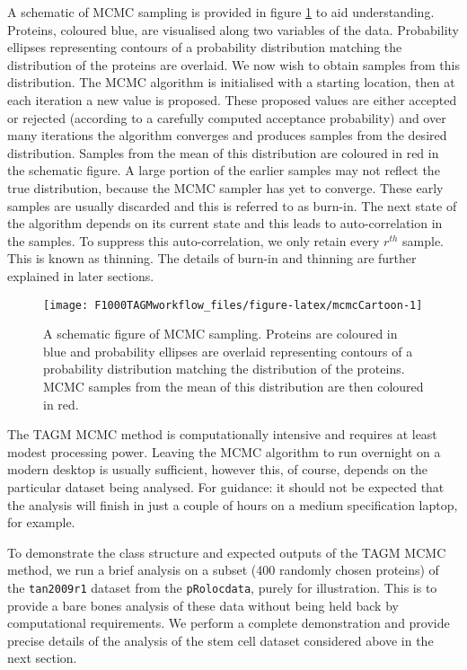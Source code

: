 \documentclass[9pt,a4paper,]{extarticle}
\begin{document}
A schematic of MCMC sampling is provided in figure
\ref{fig:mcmcCartoon} to aid understanding. Proteins, coloured blue,
are visualised along two variables of the data. Probability ellipses
representing contours of a probability distribution matching the
distribution of the proteins are overlaid. We now wish to obtain
samples from this distribution. The MCMC algorithm is initialised with
a starting location, then at each iteration a new value is
proposed. These proposed values are either accepted or rejected
(according to a carefully computed acceptance probability) and over
many iterations the algorithm converges and produces
samples from the desired distribution. Samples from the mean of this distribution
are coloured in red in the schematic figure. A large portion of the earlier
samples may not reflect the true distribution, because the MCMC
sampler has yet to converge. These early samples are usually discarded
and this is referred to as burn-in. The next state of the
algorithm depends on its current state and this leads to
auto-correlation in the samples. To suppress this auto-correlation, we
only retain every \(r^{th}\) sample. This is known as thinning. The details of burn-in and
thinning are further explained in later sections.

\begin{figure}

{\centering \texttt{[image: F1000TAGMworkflow\_files/figure-latex/mcmcCartoon-1]} 

}

\caption{A schematic figure of MCMC sampling. Proteins are coloured in blue and probability ellipses are overlaid representing contours of a probability distribution matching the distribution of the proteins. MCMC samples from the mean of this distribution are then coloured in red.}\label{fig:mcmcCartoon}
\end{figure}

The TAGM MCMC method is computationally intensive and requires at
least modest processing power. Leaving the MCMC algorithm to run
overnight on a modern desktop is usually sufficient, however this, of
course, depends on the particular dataset being analysed. For guidance: it should not be expected that the
analysis will finish in just a couple of hours on a medium specification
laptop, for example.

To demonstrate the class structure and expected outputs of the TAGM
MCMC method, we run a brief analysis on a subset (400 randomly
chosen proteins) of the \texttt{tan2009r1} dataset from the \texttt{pRolocdata},
purely for illustration. This is to provide a bare bones analysis of
these data without being held back by computational requirements. We
perform a complete demonstration and provide precise details of the
analysis of the stem cell dataset considered above in the next
section.
\end{document}

